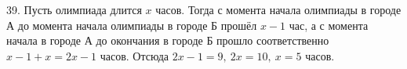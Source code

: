 39. Пусть олимпиада длится $x$ часов. Тогда с момента начала олимпиады в городе А до момента начала олимпиады в городе Б прошёл $x-1$ час, а с момента начала в городе А до окончания в городе Б прошло соответственно $x-1+x=2x-1$ часов. Отсюда $2x-1=9,\ 2x=10,\ x=5$ часов.\\
